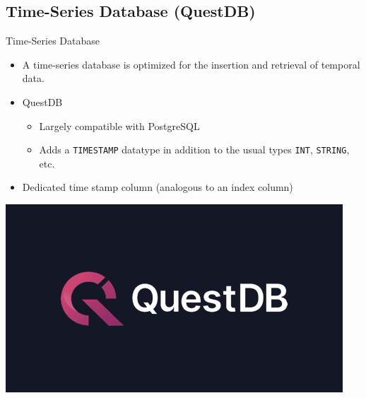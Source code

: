\subsection{Time-Series Database (QuestDB)}


\begin{frame}{Time-Series Database}
    \begin{itemize}
        \item A time-series database is optimized for the insertion and retrieval of temporal data.
        \item QuestDB
        \begin{itemize}
            \item Largely compatible with PostgreSQL
            \item Adds a {\color{red} \texttt{TIMESTAMP}} datatype in addition to the usual types \texttt{INT}, \texttt{STRING}, etc.
        \end{itemize}
        \item Dedicated time stamp column (analogous to an index column)
    \end{itemize}
    \vspace{0.6cm}
    \centering
    \includegraphics[width=0.5\linewidth]{diagrams/questdb.png}
    
\end{frame}

